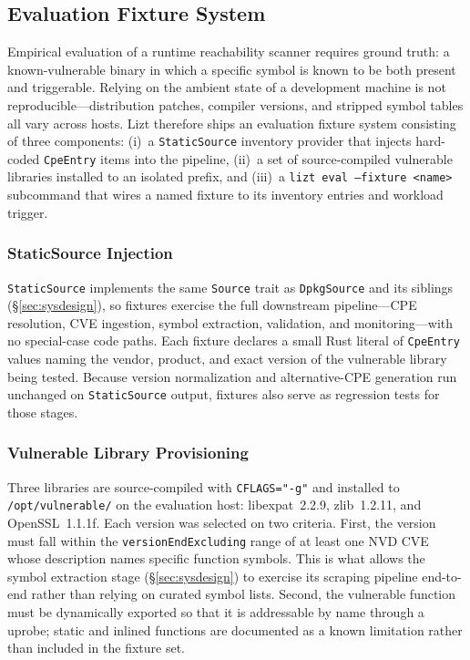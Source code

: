 \documentclass[conference]{IEEEtran}
\begin{document}
\subsection{Evaluation Fixture System}
\label{sec:fixtures}

Empirical evaluation of a runtime reachability scanner requires ground truth: a known-vulnerable binary in which a specific symbol is known to be both present and triggerable. Relying on the ambient state of a development machine is not reproducible---distribution patches, compiler versions, and stripped symbol tables all vary across hosts. Lizt therefore ships an evaluation fixture system consisting of three components: (i)~a \texttt{StaticSource} inventory provider that injects hard-coded \texttt{CpeEntry} items into the pipeline, (ii)~a set of source-compiled vulnerable libraries installed to an isolated prefix, and (iii)~a \texttt{lizt eval --fixture <name>} subcommand that wires a named fixture to its inventory entries and workload trigger.

\subsubsection{StaticSource Injection}

\texttt{StaticSource} implements the same \texttt{Source} trait as \texttt{DpkgSource} and its siblings (\S\ref{sec:sysdesign}), so fixtures exercise the full downstream pipeline---CPE resolution, CVE ingestion, symbol extraction, validation, and monitoring---with no special-case code paths. Each fixture declares a small Rust literal of \texttt{CpeEntry} values naming the vendor, product, and exact version of the vulnerable library being tested. Because version normalization and alternative-CPE generation run unchanged on \texttt{StaticSource} output, fixtures also serve as regression tests for those stages.

\subsubsection{Vulnerable Library Provisioning}

Three libraries are source-compiled with \texttt{CFLAGS="-g"} and installed to \texttt{/opt/vulnerable/} on the evaluation host: libexpat~2.2.9, zlib~1.2.11, and OpenSSL~1.1.1f. Each version was selected on two criteria. First, the version must fall within the \texttt{versionEndExcluding} range of at least one NVD CVE whose description names specific function symbols. This is what allows the symbol extraction stage (\S\ref{sec:sysdesign}) to exercise its scraping pipeline end-to-end rather than relying on curated symbol lists. Second, the vulnerable function must be dynamically exported so that it is addressable by name through a uprobe; static and inlined functions are documented as a known limitation rather than included in the fixture set.
\end{document}
